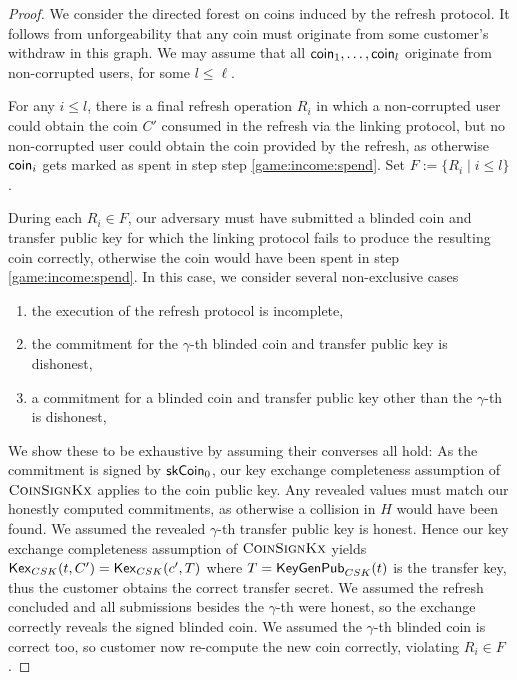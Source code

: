 \begin{proof}
  We consider the directed forest on coins induced by the refresh protocol.
  It follows from unforgeability that any coin must originate from some
  customer's withdraw in this graph.
  We may assume that all $\mathsf{coin}_1, \dots, \mathsf{coin}_l$ originate from
  non-corrupted users, for some $l \leq \ell$.  %

  For any $i \leq l$, there is a final refresh operation $R_i$ in which
  a non-corrupted user could obtain the coin $C'$ consumed in the refresh
  via the linking protocol, but no non-corrupted user could obtain the
  coin provided by the refresh, as otherwise $\mathsf{coin}_i$ gets marked as
  spent in step step \ref{game:income:spend}.
  Set $F := \{ R_i \mid i \leq l \}$.

  During each $R_i \in F$, our adversary  must have submitted a blinded
  coin and transfer public key for which the linking protocol fails to
  produce the resulting coin correctly, otherwise the coin would have
  been spent in step \ref{game:income:spend}.  In this case, we consider
  several non-exclusive cases
  \begin{enumerate}
    \item the execution of the refresh protocol is incomplete,
    \item the commitment for the $\gamma$-th blinded coin and transfer
      public key is dishonest,
    \item a commitment for a blinded coin and transfer public key other
	  than the $\gamma$-th is dishonest,
  \end{enumerate}

  We show these to be exhaustive by assuming their converses all hold: As the
  commitment is signed by $\mathsf{skCoin}_0$, our key exchange completeness
  assumption of $\textsc{CoinSignKx}$ applies to the coin public key.
  Any revealed values must match our honestly computed commitments,
  as otherwise a collision in $H$ would have been found.
  We assumed
  the revealed $\gamma$-th transfer public key is honest.  Hence our key
  exchange completeness assumption of $\textsc{CoinSignKx}$ yields
  $\mathsf{Kex}_{CSK}(t,C') = \mathsf{Kex}_{CSK}(c',T)$ where $T =
  \mathsf{KeyGenPub}_{CSK}(t)$ is the transfer key, thus the customer obtains the
  correct transfer secret.  We assumed the refresh concluded and all
  submissions besides the $\gamma$-th were honest, so the exchange correctly
  reveals the signed blinded coin.  We assumed the $\gamma$-th blinded coin is
  correct too, so customer now re-compute the new coin correctly, violating
  $R_i \in F$.


\end{proof}

